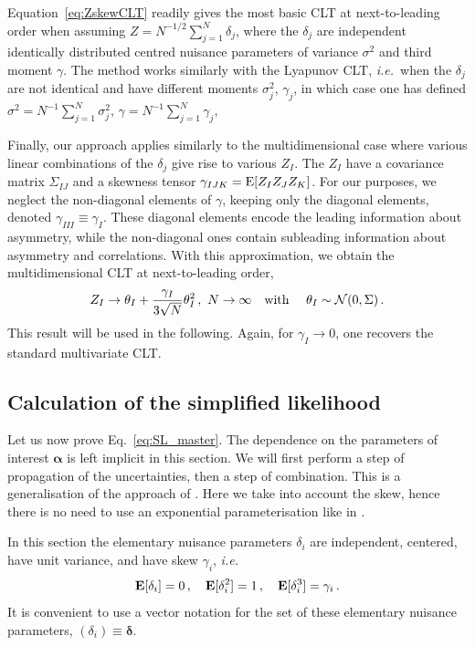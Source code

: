 \documentclass[11pt]{article}
\def\ie{{\it i.e.}}
\newcommand{\be}{\begin{equation}}
\newcommand{\ee}{\end{equation}}
\begin{document}
Equation~\eqref{eq:ZskewCLT}  readily gives the most basic CLT at next-to-leading order when assuming $Z=N^{-1/2}\sum_{j=1}^N \delta_j$, where the $\delta_j$ are  independent identically distributed centred nuisance parameters  of variance $\sigma^2$ and third moment $\gamma$. The method works similarly with the Lyapunov CLT, \ie\ when the $\delta_j$ are not identical and have different moments $\sigma^2_j$, $\gamma_j$, in which case one has defined $\sigma^2=N^{-1}\sum_{j=1}^N \sigma_j^2$, $\gamma=N^{-1}\sum_{j=1}^N \gamma_j$,

Finally, our approach applies similarly to the multidimensional case where various linear combinations of the $\delta_j$ give rise to various $Z_I$. The $Z_I$ have a covariance matrix $\Sigma_{IJ}$ and a skewness tensor $\gamma_{IJK}={\rm E}[Z_IZ_JZ_K]$. For our purposes, we neglect the non-diagonal elements of $\gamma$, keeping only  the diagonal elements, denoted $\gamma_{III}\equiv \gamma_I$. These diagonal elements encode the leading information about asymmetry, while the non-diagonal ones contain subleading information about asymmetry and correlations. With this approximation, we obtain the multidimensional CLT at next-to-leading order,
\be
Z_I\rightarrow \theta_I+\frac{\gamma_{I}}{3\sqrt{N}}\theta_I^2\,,\,\,N\rightarrow \infty  \quad \textrm{with } \quad \theta_I\sim{\cal N}(0,\Sigma)\,. \label{eq:NLCFT}
\ee
 This  result will be used in the following. Again, for $\gamma_I\rightarrow 0$, one recovers the standard multivariate CLT.



\subsection{Calculation of the simplified likelihood}
\label{se:analytic}

Let us now prove Eq.~\eqref{eq:SL_master}.  The dependence on the parameters of interest $\bm{\alpha}$ is left implicit in this section. We will first perform a step of  propagation of the uncertainties, then a step of combination. This is a generalisation of the approach of \cite{Fichet:2016gvx}. Here we take into account the skew, hence there is no need to use an exponential parameterisation like in \cite{Fichet:2016gvx}.

In this section the elementary nuisance parameters $\delta_i$ are independent, centered, have unit variance, and have skew $\gamma_i$, \ie
\be
{\bf E}[\delta_i]=0\,,\quad {\bf E}[\delta_i^2]=1 \,,\quad {\bf E}[\delta_i^3]=\gamma_i\,.
\ee
It is  convenient to use a vector notation for the set of these elementary nuisance parameters, $(\delta_i)\equiv \boldsymbol{\delta} $.
\end{document}
